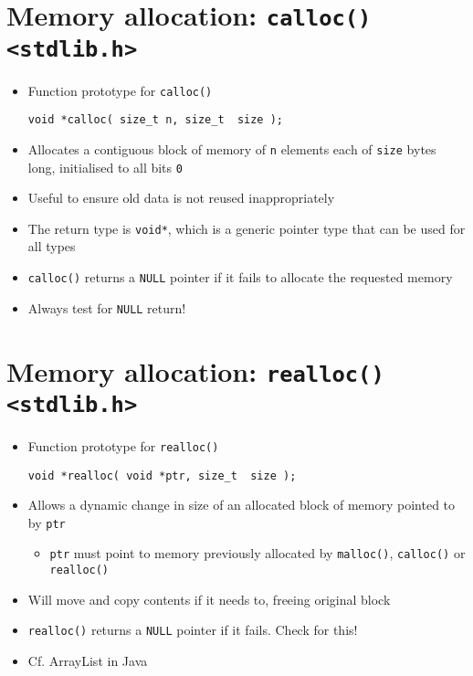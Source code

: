 \documentclass{article}
\begin{document}
\section{Memory allocation: \texttt{calloc() <stdlib.h>}}
\begin{itemize}
\item Function prototype for \verb!calloc()!
\begin{verbatim}
void *calloc( size_t n, size_t  size );
\end{verbatim}
\item Allocates a contiguous block of memory of \verb!n! elements each of \verb!size! bytes long, initialised to all bits \verb!0!

\item Useful to ensure old data is not reused inappropriately

\item The return type is \verb!void*!, which is a generic pointer type that can be used for all types

\item \verb!calloc()! returns a \verb!NULL! pointer if it fails to allocate the requested memory
\item Always test for \verb!NULL! return!
\end{itemize}



\section{Memory allocation: \texttt{realloc() <stdlib.h>}}
\begin{itemize}
\item Function prototype for \verb!realloc()!
\begin{verbatim}
void *realloc( void *ptr, size_t  size );
\end{verbatim}

\item Allows a dynamic change in size of an allocated block of memory pointed to by \verb!ptr!
\begin{itemize}
\item \verb!ptr! must point to memory previously allocated by \verb!malloc()!, \verb!calloc()! or \verb!realloc()!
\end{itemize}

\item Will move and copy contents if it needs to, freeing original block
\item \verb!realloc()! returns a \verb!NULL! pointer if it fails. Check for this!
\item Cf. ArrayList in Java
\end{itemize}
\end{document}
